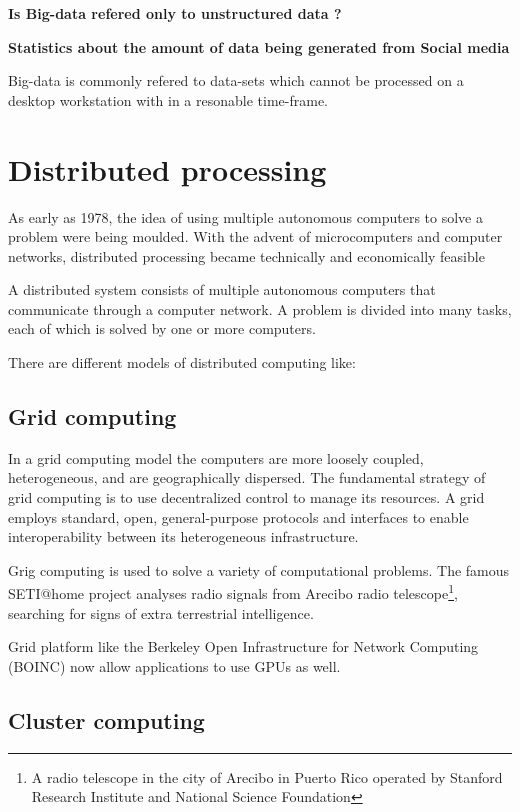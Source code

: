 \documentclass[12pt,a4paper]{report}
\begin{document}
\cite{website:ibm-bigdata} 

{\bf Is Big-data refered only to unstructured data ?}


{\bf Statistics about the amount of data being generated from Social media}

Big-data is commonly refered to data-sets which cannot be processed on a
desktop workstation with in a resonable time-frame.

\section{Distributed processing}

As early as 1978, the idea of using multiple autonomous computers to solve a problem were being
moulded. With the  advent  of  microcomputers and computer networks, distributed processing
became technically and economically feasible\cite{chu1978distributed}

A distributed system consists of multiple autonomous computers that communicate through a computer network.
A problem is divided into many tasks, each of which is solved by one or more computers.

There are different models of distributed computing like:

\subsection{Grid computing}

In a grid computing model the computers are more loosely coupled, heterogeneous, and are geographically dispersed.
The fundamental strategy of grid computing is to use decentralized control to
manage its resources.\cite{foster2002grid} A grid employs standard, open, general-purpose protocols and interfaces to enable interoperability between its heterogeneous infrastructure. 

Grig computing is used to solve a variety of computational problems. The famous SETI@home project 
analyses radio signals from  Arecibo radio telescope\footnote{A radio telescope in the city of 
Arecibo in Puerto Rico operated by Stanford Research Institute and National Science Foundation},
searching for signs of extra terrestrial intelligence.

Grid platform like the Berkeley Open Infrastructure for Network Computing
(BOINC) now allow applications to use GPUs as well.\cite{website:boinc} 

\subsection{Cluster computing}
\end{document}
